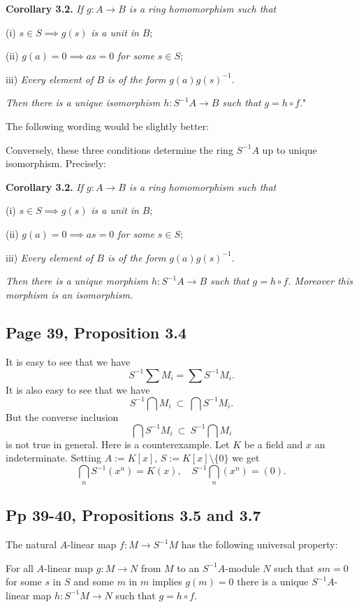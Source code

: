 \documentclass[parskip=half,fontsize=12pt]{scrartcl}%
\begin{document}
\textbf{Corollary 3.2.} \emph{If $g:A\to B$ is a ring homomorphism such that}

(i) $s\in S\implies g(s)$ \emph{is a unit in} $B$;

(ii) $g(a)=0\implies as=0$ \emph{for some} $s\in S$;

iii) \emph{Every element of $B$ is of the form} $g(a)g(s)^{-1}$.

\emph{Then there is a unique isomorphism $h:S^{-1}A\to B$ such that} $g=h\circ f$."

The following wording would be slightly better:

Conversely, these three conditions determine the ring $S^{-1}A$ up to unique isomorphism. Precisely:

\textbf{Corollary 3.2.} \emph{If $g:A\to B$ is a ring homomorphism such that}

(i) $s\in S\implies g(s)$ \emph{is a unit in} $B$;

(ii) $g(a)=0\implies as=0$ \emph{for some} $s\in S$;

iii) \emph{Every element of $B$ is of the form} $g(a)g(s)^{-1}$.

\emph{Then there is a unique morphism $h:S^{-1}A\to B$ such that $g=h\circ f$. Moreover this morphism is an isomorphism.}

\subsection{Page 39, Proposition 3.4}%

It is easy to see that we have 
$$
S^{-1}\sum M_i=\sum S^{-1}M_i.
$$ 
It is also easy to see that we have 
$$
S^{-1}\bigcap M_i\ \subset\ \bigcap S^{-1}M_i.
$$ 
But the converse inclusion 
$$
\bigcap S^{-1}M_i\ \subset\ S^{-1}\bigcap M_i
$$ 
is not true in general. Here is a counterexample. Let $K$ be a field and $x$ an indeterminate. Setting $A:=K[x]$, $S:=K[x]\setminus\{0\}$ we get 
$$
\bigcap_n S^{-1}(x^n)=K(x),\quad S^{-1}\bigcap_n(x^n)=(0).
$$

\subsection{Pp 39-40, Propositions 3.5 and 3.7}%

The natural $A$-linear map $f:M\to S^{-1}M$ has the following universal property:

For all $A$-linear map $g:M\to N$ from $M$ to an $S^{-1}A$-module $N$ such that $sm=0$ for some $s$ in $S$ and some $m$ in $m$ implies $g(m)=0$ there is a unique $S^{-1}A$-linear map $h:S^{-1}M\to N$ such that $g=h\circ f$.
\end{document}
